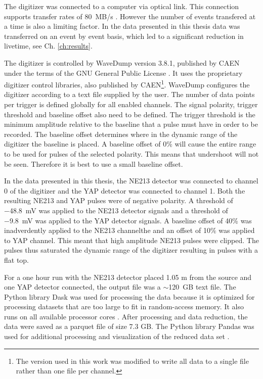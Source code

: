 \documentclass[main.tex]{subfiles}
\begin{document}
The digitizer was connected to a computer via optical link. This connection supports transfer rates of \SI{80}{MB/s} \cite{CAEN}. However the number of events transfered at a time is also a limiting factor. In the data presented in this thesis data was transferred on an event by event basis, which led to a significant reduction in livetime, see Ch. \ref{ch:results}.

The digitizer is controlled by WaveDump version 3.8.1, published by CAEN under the terms of the GNU General Public License \cite{WaveDump}. It uses the proprietary digitizer control libraries, also published by CAEN\footnote{The version used in this work was modified to write all data to a single file rather than one file per channel.}. 
WaveDump configures the digitizer according to a text file supplied by the user. The number of data points per trigger is defined globally for all enabled channels. The signal polarity, trigger threshold and baseline offset also need to be defined. The trigger threshold is the minimum amplitude relative to the baseline that a pulse must have in order to be recorded. The baseline offset determines where in the dynamic range of the digitizer the baseline is placed. A baseline offset of 0\% will cause the entire range to be used for pulses of the selected polarity. This means that undershoot will not be seen. Therefore it is best to use a small baseline offset.

In the data presented in this thesis, the NE213 detector was connected to channel 0 of the digitizer and the YAP detector was connected to channel 1. Both the resulting NE213 and YAP pulses were of negative polarity. A threshold of \SI{-48.8}{mV} was applied to the NE213 detector signals and a threshold of \SI{-9.8}{mV} was applied to the YAP detector signals. A baseline offset of 40\% was inadverdently applied to the NE213 channelthe and an offset of 10\% was applied to  YAP channel. This meant that high amplitude NE213 pulses were clipped. The pulses thus saturated the dynamic range of the digitizer resulting in pulses with a flat top.

For a one hour run with the NE213 detector placed 1.05 m from the source and one YAP detector connected, the output file was a $\sim$\SI{120}{GB} text file. The Python library Dask was used for processing the data because it is optimized for processing datasets that are too large to fit in random-access memory. It also runs on all available processor cores \cite{Dask}. After processing and data reduction, the data were saved as a parquet file of size 7.3 GB. The Python library Pandas was used for additional processing and visualization of the reduced data set \cite{Pandas}.
\end{document}
